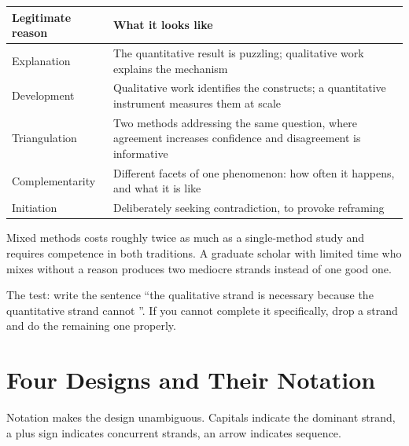 \begin{center}
\small
\begin{tabular}{@{}L{4.0cm}L{10.3cm}@{}}
\toprule
\textbf{Legitimate reason} & \textbf{What it looks like} \\
\midrule
Explanation
  & The quantitative result is puzzling; qualitative work explains the
    mechanism \\
Development
  & Qualitative work identifies the constructs; a quantitative instrument
    measures them at scale \\
Triangulation
  & Two methods addressing the same question, where agreement increases
    confidence and disagreement is informative \\
Complementarity
  & Different facets of one phenomenon: how often it happens, and what it is
    like \\
Initiation
  & Deliberately seeking contradiction, to provoke reframing \\
\bottomrule
\end{tabular}
\end{center}

\begin{alertbox}
Mixed methods costs roughly twice as much as a single-method study and requires
competence in both traditions. A graduate scholar with limited time who mixes
without a reason produces two mediocre strands instead of one good one.

\medskip
The test: write the sentence ``the qualitative strand is necessary because the
quantitative strand cannot \underline{\hspace{25mm}}''. If you cannot complete
it specifically, drop a strand and do the remaining one properly.
\end{alertbox}

\section{Four Designs and Their Notation}

Notation makes the design unambiguous. Capitals indicate the dominant strand,
a plus sign indicates concurrent strands, an arrow indicates sequence.

